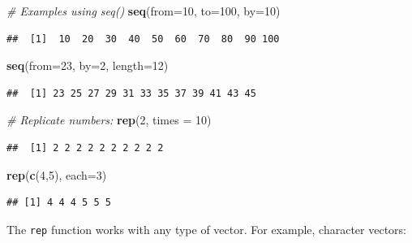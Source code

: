 \documentclass[]{book}
\newenvironment{Shaded}{\begin{snugshade}}{\end{snugshade}}
\newcommand{\CommentTok}[1]{\textcolor[rgb]{0.56,0.35,0.01}{\textit{#1}}}
\newcommand{\DataTypeTok}[1]{\textcolor[rgb]{0.13,0.29,0.53}{#1}}
\newcommand{\DecValTok}[1]{\textcolor[rgb]{0.00,0.00,0.81}{#1}}
\newcommand{\KeywordTok}[1]{\textcolor[rgb]{0.13,0.29,0.53}{\textbf{#1}}}
\newcommand{\NormalTok}[1]{#1}
\begin{document}
\begin{Shaded}
\begin{Highlighting}[]
\CommentTok{# Examples using seq()}
\KeywordTok{seq}\NormalTok{(}\DataTypeTok{from=}\DecValTok{10}\NormalTok{, }\DataTypeTok{to=}\DecValTok{100}\NormalTok{, }\DataTypeTok{by=}\DecValTok{10}\NormalTok{)}
\end{Highlighting}
\end{Shaded}

\begin{verbatim}
##  [1]  10  20  30  40  50  60  70  80  90 100
\end{verbatim}

\begin{Shaded}
\begin{Highlighting}[]
\KeywordTok{seq}\NormalTok{(}\DataTypeTok{from=}\DecValTok{23}\NormalTok{, }\DataTypeTok{by=}\DecValTok{2}\NormalTok{, }\DataTypeTok{length=}\DecValTok{12}\NormalTok{)}
\end{Highlighting}
\end{Shaded}

\begin{verbatim}
##  [1] 23 25 27 29 31 33 35 37 39 41 43 45
\end{verbatim}

\begin{Shaded}
\begin{Highlighting}[]
\CommentTok{# Replicate numbers:}
\KeywordTok{rep}\NormalTok{(}\DecValTok{2}\NormalTok{, }\DataTypeTok{times =} \DecValTok{10}\NormalTok{)}
\end{Highlighting}
\end{Shaded}

\begin{verbatim}
##  [1] 2 2 2 2 2 2 2 2 2 2
\end{verbatim}

\begin{Shaded}
\begin{Highlighting}[]
\KeywordTok{rep}\NormalTok{(}\KeywordTok{c}\NormalTok{(}\DecValTok{4}\NormalTok{,}\DecValTok{5}\NormalTok{), }\DataTypeTok{each=}\DecValTok{3}\NormalTok{)}
\end{Highlighting}
\end{Shaded}

\begin{verbatim}
## [1] 4 4 4 5 5 5
\end{verbatim}

The \texttt{rep} function works with any type of vector. For example, character vectors:
\end{document}
